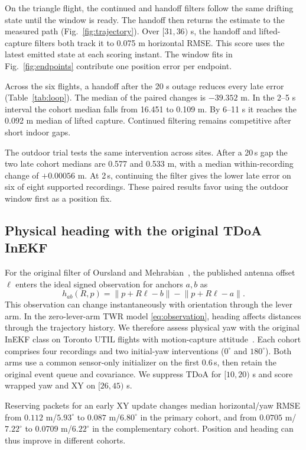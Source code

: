 \documentclass{IEEEtaes}
\newcommand{\norm}[1]{\left\lVert#1\right\rVert}
\begin{document}
On the triangle flight, the continued and handoff filters follow the same drifting state until the window is ready. The handoff then returns the estimate to the measured path (Fig.~\ref{fig:trajectory}). Over \([31,36)\) s, the handoff and lifted-capture filters both track it to 0.075 m horizontal RMSE. This score uses the latest emitted state at each scoring instant. The window fits in Fig.~\ref{fig:endpoints} contribute one position error per endpoint.

Across the six flights, a handoff after the 20 s outage reduces every late error (Table~\ref{tab:loop}). The median of the paired changes is \(-39.352\) m. In the 2--5 s interval the cohort median falls from 16.451 to 0.109 m. By 6--11 s it reaches the 0.092 m median of lifted capture. Continued filtering remains competitive after short indoor gaps.

The outdoor trial tests the same intervention across sites. After a 20\,s gap the two late cohort medians are 0.577 and 0.533 m, with a median within-recording change of \(+0.00056\) m. At 2\,s, continuing the filter gives the lower late error on six of eight supported recordings. These paired results favor using the outdoor window first as a position fix.

\subsection{Physical heading with the original TDoA InEKF}
For the original filter of Oursland and Mehrabian~\cite{oursland}, the published antenna offset \(\ell\) enters the ideal signed observation for anchors \(a,b\) as
\begin{equation}
 h_{ab}(R,p)=\norm{p+R\ell-b}-\norm{p+R\ell-a}. \label{eq:tdoa}
\end{equation}
This observation can change instantaneously with orientation through the lever arm. In the zero-lever-arm TWR model \eqref{eq:observation}, heading affects distances through the trajectory history. We therefore assess physical yaw with the original InEKF class on Toronto UTIL flights with motion-capture attitude~\cite{util}. Each cohort comprises four recordings and two initial-yaw interventions (\(0^\circ\) and \(180^\circ\)). Both arms use a common sensor-only initializer on the first 0.6\,s, then retain the original event queue and covariance. We suppress TDoA for \([10,20)\) s and score wrapped yaw and XY on \([26,45)\) s.

Reserving packets for an early XY update changes median horizontal/yaw RMSE from \(0.112\) m/\(5.93^\circ\) to \(0.087\) m/\(6.80^\circ\) in the primary cohort, and from \(0.0705\) m/\(7.22^\circ\) to \(0.0709\) m/\(6.22^\circ\) in the complementary cohort. Position and heading can thus improve in different cohorts.
\end{document}
